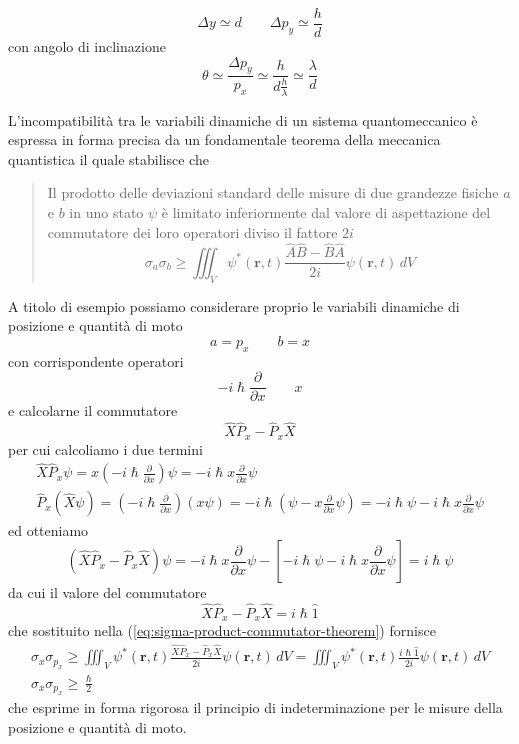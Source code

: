 \[
	\Delta y \simeq d \qquad \Delta p_{y} \simeq \frac{h}{d}
\] con angolo di inclinazione
\[
	\theta \simeq \frac{\Delta p_{y}}{p_{x}} \simeq \frac{h}{d \frac{h}{\lambda}} \simeq \frac{\lambda}{d}
\]
\bigskip

L'incompatibilità tra le variabili dinamiche di un sistema
quantomeccanico è espressa in forma precisa da un fondamentale teorema
della meccanica quantistica il quale stabilisce che

\begin{quote}
	Il prodotto delle deviazioni standard delle misure di due grandezze
	fisiche \(a\) e \(b\) in uno stato \(\psi\) è limitato inferiormente dal
	valore di aspettazione del commutatore dei loro operatori diviso il
	fattore \(2i\)
	\begin{equation}
		\boxed{\sigma_{a} \sigma_{b} \geq \iiint_{V} \psi^{*}(\bm{r},t) \frac{\hat{A}\hat{B} -\hat{B}\hat{A}}{2i}
		\psi(\bm{r},t) \, dV}
		\label{eq:sigma-product-commutator-theorem}
	\end{equation}
\end{quote}

A titolo di esempio possiamo considerare proprio le variabili dinamiche
di posizione e quantità di moto
\[
   a = p_x \qquad b = x
\]
con corrispondente operatori \[
	- i \hslash \frac{\partial}{\partial x} \qquad x
\] e calcolarne il commutatore
\[
	\hat{X}\hat{P}_{x} - \hat{P}_{x}\hat{X}
\] per cui calcoliamo i due termini \begin{gather*}
	\hat{X}\hat{P}_{x} \psi = x \left(  - i \hslash \frac{\partial}{\partial x} \right) \psi = - i \hslash x \frac{\partial}{\partial x}\psi\\
	\hat{P}_{x}(\hat{X} \psi) = \left( - i \hslash \frac{\partial}{\partial x} \right)(x \psi)  =
	- i \hslash \left( \psi - x \frac{\partial}{\partial x} \psi \right) = - i \hslash \psi - i \hslash x \frac{\partial}{\partial x} \psi
\end{gather*}
ed otteniamo
\[
	(\hat{X}\hat{P}_{x} - \hat{P}_{x}\hat{X}) \psi = - i \hslash x \frac{\partial}{\partial x}\psi - \left[ - i \hslash \psi - i \hslash x \frac{\partial}{\partial x} \psi \right] = i \hslash \psi
\]
da cui il valore del commutatore
\[
	\hat{X}\hat{P}_{x} - \hat{P}_{x}\hat{X} = i \hslash  \hat{1}
\]
che sostituito nella (\ref{eq:sigma-product-commutator-theorem}) fornisce
\begin{gather*}
	\sigma_{x} \sigma_{p_{x}} \geq \iiint_{V} \psi^{*}(\bm{r},t) \frac{\hat{X}\hat{P}_{x} - \hat{P}_{x}\hat{X}}{2 i } \psi(\bm{r},t) \, dV =
	\iiint_{V} \psi^{*}(\bm{r},t) \frac{i \hslash  \hat{1}}{2i}\psi(\bm{r},t) \, dV\\
	\sigma_{x}\sigma_{p_{x}} \geq \frac{\hslash}{2}
\end{gather*}
che esprime in forma rigorosa il principio di indeterminazione per le
misure della posizione e quantità di moto.

